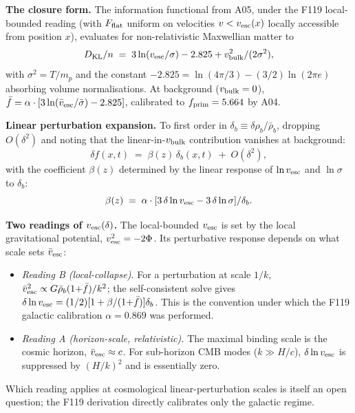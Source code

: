\documentclass[aps,prd,twocolumn,nofootinbib,floatfix,superscriptaddress]{revtex4-2}
\newcommand{\dKL}{D_{\rm KL}}
\newcommand{\fprim}{f_{\rm prim}}
\begin{document}
\textbf{The closure form.}
The information functional from A05, under the F119 local-bounded
reading (with $F_{\rm flat}$ uniform on velocities $v < v_{\rm esc}(x)$
locally accessible from position $x$), evaluates for non-relativistic
Maxwellian matter to
\begin{equation}
\label{eq:DKL_evaluated}
\dKL/n \;=\; 3\ln(v_{\rm esc}/\sigma) - 2.825 + v_{\rm bulk}^2/(2\sigma^2),
\end{equation}
with $\sigma^2 = T/m_p$ and the constant $-2.825 = \ln(4\pi/3) -
(3/2)\ln(2\pi e)$ absorbing volume normalisations. At background
($v_{\rm bulk} = 0$), $\bar f = \alpha \cdot [3\ln(\bar v_{\rm esc}/\bar\sigma)
- 2.825]$, calibrated to $\fprim = 5.664$ by A04.

\textbf{Linear perturbation expansion.}
To first order in $\delta_b \equiv \delta\rho_b/\bar\rho_b$, dropping
$O(\delta^2)$ and noting that the linear-in-$v_{\rm bulk}$ contribution
vanishes at background:
\begin{equation}
\label{eq:delta_f_linear}
\delta f(x,t) \;=\; \beta(z)\,\delta_b(x,t) \;+\; O(\delta^2),
\end{equation}
with the coefficient $\beta(z)$ determined by the linear response of
$\ln v_{\rm esc}$ and $\ln\sigma$ to $\delta_b$:
\begin{equation}
\label{eq:beta_def}
\beta(z) \;=\; \alpha \cdot [3\,\delta\ln v_{\rm esc} - 3\,\delta\ln\sigma]/\delta_b.
\end{equation}

\textbf{Two readings of $v_{\rm esc}(\delta)$.}
The local-bounded $v_{\rm esc}$ is set by the local gravitational
potential, $v_{\rm esc}^2 = -2\Phi$. Its perturbative response depends
on what scale sets $\bar v_{\rm esc}$:
\begin{itemize}
\item \emph{Reading B (local-collapse).} For a perturbation at
scale $1/k$, $\bar v_{\rm esc}^2 \propto G\bar\rho_b(1{+}\bar f)/k^2$;
the self-consistent solve gives $\delta\ln v_{\rm esc} = (1/2)[1 +
\beta/(1{+}\bar f)]\delta_b$. This is the convention under which
the F119 galactic calibration $\alpha = 0.869$ was performed.
\item \emph{Reading A (horizon-scale, relativistic).} The maximal
binding scale is the cosmic horizon, $\bar v_{\rm esc} \approx c$.
For sub-horizon CMB modes ($k \gg H/c$), $\delta\ln v_{\rm esc}$ is
suppressed by $(H/k)^2$ and is essentially zero.
\end{itemize}
Which reading applies at cosmological linear-perturbation scales is
itself an open question; the F119 derivation directly calibrates
only the galactic regime.
\end{document}
